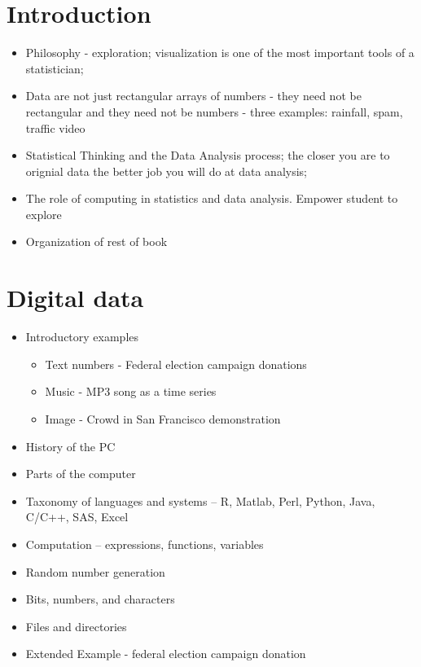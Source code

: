 \documentclass[11pt,timesroman]{article}
\begin{document}
\section{Introduction}
  \begin{itemize}
  \item Philosophy - exploration; visualization is one of the most
    important tools of a statistician;
  \item Data are not just rectangular arrays of numbers - they need
    not be rectangular and they need not be numbers - three examples:
    rainfall, spam, traffic video
  \item Statistical Thinking and the Data Analysis process; the closer
    you are to orignial data the better job you will do at data
    analysis;
  \item The role of computing in statistics and data analysis.
    Empower student to explore
  \item Organization of rest of book
  \end{itemize}


\section{Digital data}
        \begin{itemize}
        \item Introductory examples
          \begin{itemize}
          \item Text numbers - Federal election campaign donations
          \item Music - MP3 song as a time series
          \item Image - Crowd in San Francisco demonstration
          \end{itemize}
        \item History of the PC
        \item Parts of the computer
        \item Taxonomy of languages and systems -- R, Matlab, Perl,
          Python, Java, C/C++, SAS, Excel
        \item Computation -- expressions, functions, variables 
        \item Random number generation
        \item Bits, numbers, and characters
        \item Files and directories
        \item Extended Example - federal election campaign donation
        \end{itemize}
\end{document}
